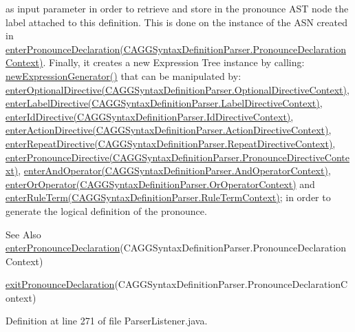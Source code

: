  as input parameter in order to retrieve and store in the pronounce A\-S\-T node the label attached to this definition. This is done on the instance of the A\-S\-N created in \hyperlink{}{enter\-Pronounce\-Declaration(\-C\-A\-G\-G\-Syntax\-Definition\-Parser.\-Pronounce\-Declaration\-Context)}. Finally, it creates a new Expression Tree instance by calling\-: \hyperlink{classit_1_1emarolab_1_1cagg_1_1core_1_1language_1_1parser_1_1ANTLRInterface_1_1TreeParserListener_adc4d433740aee2e537ee65c3dd7a1748}{new\-Expression\-Generator()} that can be manipulated by\-: \hyperlink{}{enter\-Optional\-Directive(\-C\-A\-G\-G\-Syntax\-Definition\-Parser.\-Optional\-Directive\-Context)}, \hyperlink{}{enter\-Label\-Directive(\-C\-A\-G\-G\-Syntax\-Definition\-Parser.\-Label\-Directive\-Context)}, \hyperlink{}{enter\-Id\-Directive(\-C\-A\-G\-G\-Syntax\-Definition\-Parser.\-Id\-Directive\-Context)}, \hyperlink{}{enter\-Action\-Directive(\-C\-A\-G\-G\-Syntax\-Definition\-Parser.\-Action\-Directive\-Context)}, \hyperlink{}{enter\-Repeat\-Directive(\-C\-A\-G\-G\-Syntax\-Definition\-Parser.\-Repeat\-Directive\-Context)}, \hyperlink{}{enter\-Pronounce\-Directive(\-C\-A\-G\-G\-Syntax\-Definition\-Parser.\-Pronounce\-Directive\-Context)}, \hyperlink{}{enter\-And\-Operator(\-C\-A\-G\-G\-Syntax\-Definition\-Parser.\-And\-Operator\-Context)}, \hyperlink{}{enter\-Or\-Operator(\-C\-A\-G\-G\-Syntax\-Definition\-Parser.\-Or\-Operator\-Context)} and \hyperlink{}{enter\-Rule\-Term(\-C\-A\-G\-G\-Syntax\-Definition\-Parser.\-Rule\-Term\-Context)}; in order to generate the logical definition of the pronounce. \begin{DoxySeeAlso}{See Also}
\hyperlink{classit_1_1emarolab_1_1cagg_1_1core_1_1language_1_1parser_1_1ParserListener_a964aca142e5e1253c64798d9daff04b9}{enter\-Pronounce\-Declaration}(C\-A\-G\-G\-Syntax\-Definition\-Parser.\-Pronounce\-Declaration\-Context) 

\hyperlink{classit_1_1emarolab_1_1cagg_1_1core_1_1language_1_1parser_1_1ParserListener_a277d97afa1957989d49938197b3b4b2d}{exit\-Pronounce\-Declaration}(C\-A\-G\-G\-Syntax\-Definition\-Parser.\-Pronounce\-Declaration\-Context) 
\end{DoxySeeAlso}


Definition at line 271 of file Parser\-Listener.\-java.

